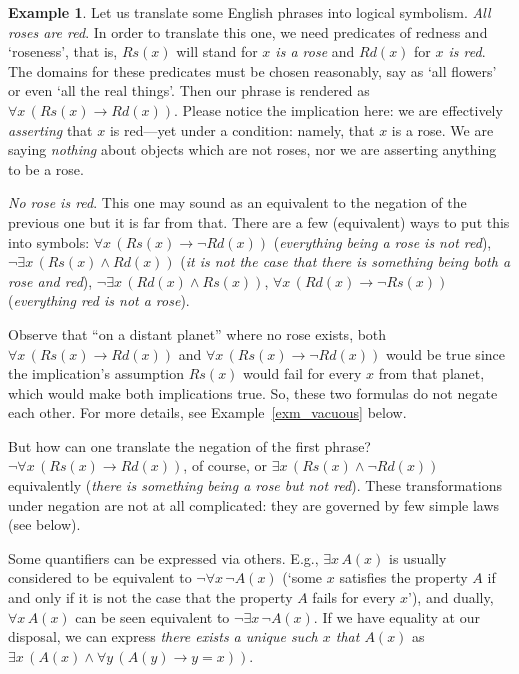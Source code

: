 \documentclass[12pt,notitlepage]{article}
\theoremstyle{plain}
\theoremstyle{definition}
\newtheorem{exm}[thm]{Example}
\theoremstyle{plain}
\newcommand{\1}{\mathbf{1}}
\newcommand{\0}{\mathbf{0}}
\begin{document}
\begin{exm}
Let us translate some English phrases into logical symbolism. \emph{All roses are red}. In order to translate this one, we need predicates of redness and `roseness', that is, $Rs(x)$ will stand for \emph{$x$ is a rose} and $Rd(x)$ for \emph{$x$ is red}. The domains for these predicates must be chosen reasonably, say as `all flowers' or even `all the real things'. Then our phrase is rendered as $\forall x\, (Rs(x) \to Rd(x))$. Please notice the implication here: we are effectively \emph{asserting} that $x$ is red---yet under a condition: namely, that $x$ is a rose. We are saying \emph{nothing} about objects which are not roses, nor we are asserting anything to be a rose.

\emph{No rose is red}. This one may sound as an equivalent to the negation of the previous one but it is far from that. There are a few (equivalent) ways to put this into symbols: $\forall x\, (Rs(x) \to \neg Rd(x))$ (\emph{everything being a rose is not red}), $\neg \exists x\, (Rs(x) \wedge Rd(x))$ (\emph{it is not the case that there is something being both a rose and red}), $\neg \exists x\, (Rd(x) \wedge Rs(x))$, $\forall x\, (Rd(x) \to \neg Rs(x))$ (\emph{everything red is not a rose}).

Observe that ``on a distant planet'' where no rose exists, both $\forall x\, (Rs(x) \to Rd(x))$ and $\forall x\, (Rs(x) \to \neg Rd(x))$ would be true since the implication's assumption $Rs(x)$ would fail for every $x$ from that planet, which would make both implications true. So, these two formulas do not negate each other. For more details, see Example~\ref{exm_vacuous} below.

But how can one translate the negation of the first phrase? $\neg \forall x\, (Rs(x) \to Rd(x))$, of course, or  $\exists x\, (Rs(x) \wedge \neg Rd(x))$ equivalently (\emph{there is something being a rose but not red}). These transformations under negation are not at all complicated: they are governed by few simple laws (see below).
\end{exm}

Some quantifiers can be expressed via others. E.g., $\exists x\, A(x)$ is usually considered to be equivalent to $\neg \forall x\, \neg A(x)$ (`some $x$ satisfies the property $A$ if and only if it is not the case that the property $A$ fails for every $x$'), and dually, $\forall x\, A(x)$ can be seen equivalent to $\neg \exists x\, \neg A(x)$. If we have equality at our disposal, we can express \emph{there exists a unique such $x$ that $A(x)$} as $\exists x\, (A(x) \wedge \forall y\, (A(y) \to y = x))$.
\end{document}
